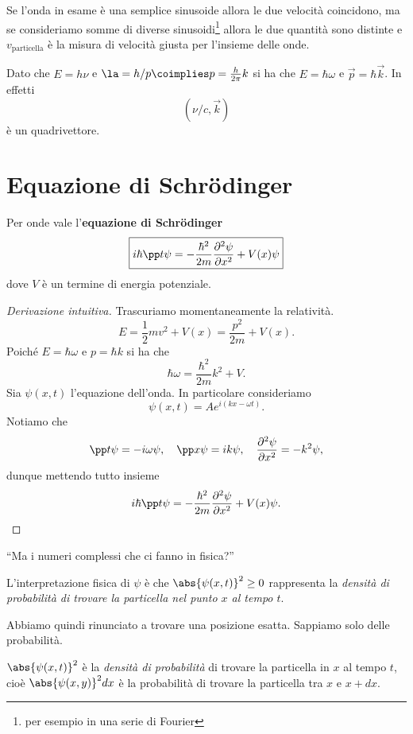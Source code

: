 \noindent
Se l'onda in esame \`e una semplice sinusoide allora le due velocit\`a coincidono, ma se consideriamo somme di diverse sinusoidi\footnote{per esempio in una serie di Fourier} allora le due quantit\`a sono distinte e $v_{\text{particella}}$ \`e la misura di velocit\`a giusta per l'insieme delle onde.

\begin{remark}
Dato che $E=h\nu$ e $\la=h/p\coimplies p=\frac h{2\pi}k$ si ha che $E=\hbar\omega$ e $\vec p=\hbar \vec k$. In effetti
\[(\nu/c,\vec k)\]
\`e un quadrivettore.
\end{remark}


\section{Equazione di Schr\"odinger}

\begin{theorem}\label{EquazioneSchrodinger}
Per onde vale l'\textbf{equazione di Schr\"odinger}
\[\boxed{i\hbar \pp t\psi=-\frac{\hbar^2}{2m}\pps[2]x\psi +V(x)\psi}\]
dove $V$ \`e un termine di energia potenziale.
\end{theorem}
\begin{proof}[Derivazione intuitiva]
Trascuriamo momentaneamente la relativit\`a.
\[E=\frac12mv^2+V(x)=\frac{p^2}{2m}+V(x).\]
Poich\'e $E=\hbar \omega$ e $p=\hbar k$ si ha che
\[\hbar \omega=\frac{\hbar^2}{2m}k^2+V.\]
Sia $\psi(x,t)$ l'equazione dell'onda. In particolare consideriamo
\[\psi(x,t)=Ae^{i(kx-\omega t)}.\]
Notiamo che
\[\pp t\psi=-i\omega\psi,\quad \pp x\psi=ik\psi,\quad \pps[2]x\psi=-k^2\psi,\]
dunque mettendo tutto insieme
\[i\hbar \pp t\psi=-\frac{\hbar^2}{2m}\pps[2]x\psi +V(x)\psi.\]
\end{proof}
\begin{center}
``Ma i numeri complessi che ci fanno in fisica?''
\end{center}
L'interpretazione fisica di $\psi$ \`e che $\abs{\psi(x,t)}^2\geq 0$ rappresenta la \textit{densit\`a di probabilit\`a di trovare la particella nel punto $x$ al tempo $t$}.
\bigskip

\noindent
Abbiamo quindi rinunciato a trovare una posizione esatta. Sappiamo solo delle probabilit\`a.


\begin{remark}
$\abs{\psi(x,t)}^2$ \`e la \textit{densit\`a di probabilit\`a} di trovare la particella in $x$ al tempo $t$, cio\`e $\abs{\psi(x,y)}^2dx$ \`e la probabilit\`a di trovare la particella tra $x$ e $x+dx$.
\end{remark}

